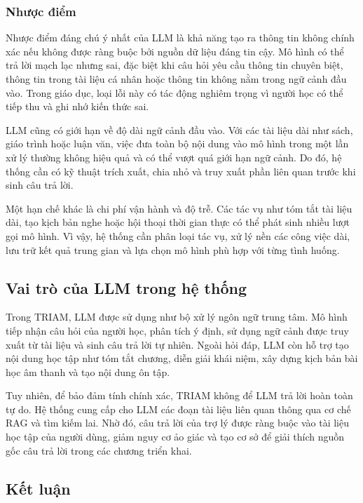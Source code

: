 \documentclass[12pt,a4paper]{report}
\begin{document}
\subsubsection{Nhược điểm}

Nhược điểm đáng chú ý nhất của LLM là khả năng tạo ra thông tin không chính xác nếu không được ràng buộc bởi nguồn dữ liệu đáng tin cậy. Mô hình có thể trả lời mạch lạc nhưng sai, đặc biệt khi câu hỏi yêu cầu thông tin chuyên biệt, thông tin trong tài liệu cá nhân hoặc thông tin không nằm trong ngữ cảnh đầu vào. Trong giáo dục, loại lỗi này có tác động nghiêm trọng vì người học có thể tiếp thu và ghi nhớ kiến thức sai.

LLM cũng có giới hạn về độ dài ngữ cảnh đầu vào. Với các tài liệu dài như sách, giáo trình hoặc luận văn, việc đưa toàn bộ nội dung vào mô hình trong một lần xử lý thường không hiệu quả và có thể vượt quá giới hạn ngữ cảnh. Do đó, hệ thống cần có kỹ thuật trích xuất, chia nhỏ và truy xuất phần liên quan trước khi sinh câu trả lời.

Một hạn chế khác là chi phí vận hành và độ trễ. Các tác vụ như tóm tắt tài liệu dài, tạo kịch bản nghe hoặc hội thoại thời gian thực có thể phát sinh nhiều lượt gọi mô hình. Vì vậy, hệ thống cần phân loại tác vụ, xử lý nền các công việc dài, lưu trữ kết quả trung gian và lựa chọn mô hình phù hợp với từng tình huống.

\subsection{Vai trò của LLM trong hệ thống}

Trong TRIAM, LLM được sử dụng như bộ xử lý ngôn ngữ trung tâm. Mô hình tiếp nhận câu hỏi của người học, phân tích ý định, sử dụng ngữ cảnh được truy xuất từ tài liệu và sinh câu trả lời tự nhiên. Ngoài hỏi đáp, LLM còn hỗ trợ tạo nội dung học tập như tóm tắt chương, diễn giải khái niệm, xây dựng kịch bản bài học âm thanh và tạo nội dung ôn tập.

Tuy nhiên, để bảo đảm tính chính xác, TRIAM không để LLM trả lời hoàn toàn tự do. Hệ thống cung cấp cho LLM các đoạn tài liệu liên quan thông qua cơ chế RAG và tìm kiếm lai. Nhờ đó, câu trả lời của trợ lý được ràng buộc vào tài liệu học tập của người dùng, giảm nguy cơ ảo giác và tạo cơ sở để giải thích nguồn gốc câu trả lời trong các chương triển khai.

\subsection{Kết luận}
\end{document}
